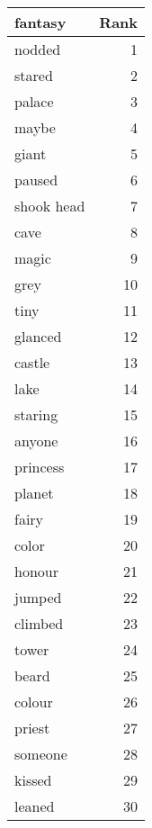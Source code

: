\begin{table}
\label{tab:fantasy_terms}
\begin{tabular}{lr}
\toprule
fantasy & Rank \\
\midrule
nodded & 1 \\
stared & 2 \\
palace & 3 \\
maybe & 4 \\
giant & 5 \\
paused & 6 \\
shook head & 7 \\
cave & 8 \\
magic & 9 \\
grey & 10 \\
tiny & 11 \\
glanced & 12 \\
castle & 13 \\
lake & 14 \\
staring & 15 \\
anyone & 16 \\
princess & 17 \\
planet & 18 \\
fairy & 19 \\
color & 20 \\
honour & 21 \\
jumped & 22 \\
climbed & 23 \\
tower & 24 \\
beard & 25 \\
colour & 26 \\
priest & 27 \\
someone & 28 \\
kissed & 29 \\
leaned & 30 \\
\bottomrule
\end{tabular}
\end{table}
